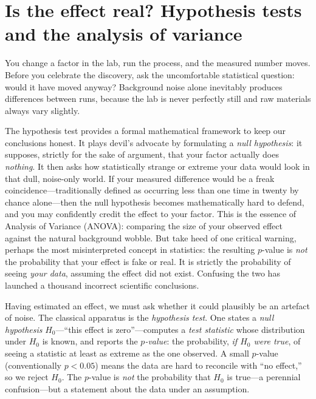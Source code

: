 \section{Is the effect real? Hypothesis tests and the analysis of variance}
\label{sec:stats-anova}

You change a factor in the lab, run the process, and the measured number moves. Before you celebrate the discovery,
ask the uncomfortable statistical question: would it have moved anyway? Background noise alone inevitably produces
differences between runs, because the lab is never perfectly still and raw materials always vary slightly.

The hypothesis test provides a formal mathematical framework to keep our conclusions honest. It plays devil's advocate
by formulating a \emph{null hypothesis}: it supposes, strictly for the sake of argument, that your factor actually does \emph{nothing}.
It then asks how statistically strange or extreme your data would look in that dull, noise-only world. If your measured difference
would be a freak coincidence---traditionally defined as occurring less than one time in twenty by chance alone---then the null hypothesis
becomes mathematically hard to defend, and you may confidently credit the effect to your factor. This is the essence of Analysis of Variance (ANOVA):
comparing the size of your observed effect against the natural background wobble. But take heed of one critical warning,
perhaps the most misinterpreted concept in statistics: the resulting $p$-value is \emph{not} the probability that your effect is fake or real.
It is strictly the probability of seeing \emph{your data}, assuming the effect did not exist. Confusing the two
has launched a thousand incorrect scientific conclusions.

Having estimated an effect, we must ask whether it could plausibly be an
artefact of noise. The classical apparatus is the \emph{hypothesis test}. One
states a \emph{null hypothesis} $H_0$---``this effect is zero''---computes a
\emph{test statistic} whose distribution under $H_0$ is known, and reports the
\emph{$p$-value}: the probability, \emph{if $H_0$ were true}, of seeing a
statistic at least as extreme as the one observed. A small $p$-value
(conventionally $p<0.05$) means the data are hard to reconcile with ``no
effect,'' so we reject $H_0$. The $p$-value is \emph{not} the probability that
$H_0$ is true---a perennial confusion---but a statement about the data under an
assumption.

